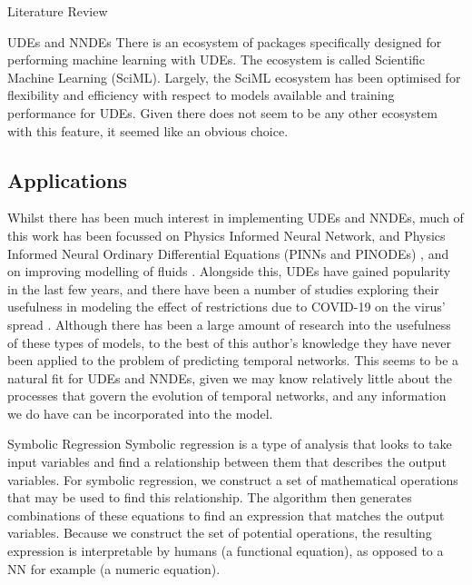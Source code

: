 \documentclass[12pt]{amsbook}
\begin{document}
\begin{chapter}{Literature Review}
\begin{section}{UDEs and NNDEs}
            There is an ecosystem of packages specifically designed for performing machine learning with UDEs. The ecosystem is called Scientific Machine Learning (SciML)\cite{SciML_C_Rak}. Largely, the SciML ecosystem has been optimised for flexibility and efficiency with respect to models available and training performance for UDEs. Given there does not seem to be any other ecosystem with this feature, it seemed like 
            an obvious choice.
        
        \subsection{Applications}
            Whilst there has been much interest in implementing UDEs and NNDEs, much of this work has been focussed on Physics Informed Neural Network, and Physics Informed Neural Ordinary Differential Equations (PINNs and PINODEs) \cite{karniadakis2021physics,GAO2021110079,krishnapriyan2021characterizing,roehrl2020modeling}, and on improving modelling of fluids \cite{mahmoudabadbozchelou2021data,nguyen2022physics}. Alongside this, UDEs have gained popularity in the last few years, and there have been a number of studies exploring their usefulness in modeling the effect of restrictions due to COVID-19 on the virus' spread \cite{Dandekar2020.04.03.20052084}. Although there has been a large amount of research into the usefulness of these types of models, to the best of this author's knowledge they have never been applied to the problem of predicting temporal networks. This seems to be a natural fit for UDEs and NNDEs, given we may know relatively little about the processes that govern the evolution of temporal networks, and any information we do have can be incorporated into the model.
    \end{section}
    \begin{section}{Symbolic Regression}
        Symbolic regression is a type of analysis that looks to take input variables and find a relationship between them that describes the output variables. For symbolic regression, we construct a set of mathematical operations that may be used to find this relationship. The algorithm then generates combinations of these equations to find an expression that matches the output variables. Because we construct the set of potential operations, the resulting expression is interpretable by humans (a functional equation), as opposed to a NN for example (a numeric equation). 


\end{section}
\end{chapter}
\end{document}

